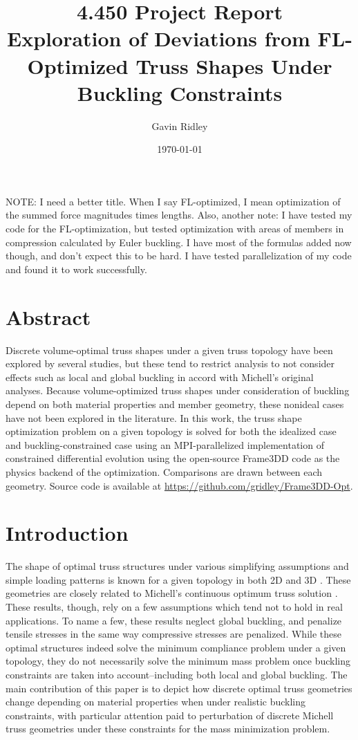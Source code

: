 \documentclass{article}
\author{Gavin Ridley}
\date{\today}
\title{4.450 Project Report\\ Exploration of Deviations from FL-Optimized Truss Shapes Under Buckling Constraints}
\begin{document}
\maketitle

NOTE: I need a better title. When I say FL-optimized, I mean optimization of the summed force magnitudes times lengths.
Also, another note: I have tested my code for the FL-optimization, but tested optimization with areas of members in compression
calculated by Euler buckling. I have most of the formulas added now though, and don't expect this to be hard. I have tested parallelization
of my code and found it to work successfully.

\section{Abstract}
Discrete volume-optimal truss shapes under a given truss topology have been explored by
several studies, but these tend to restrict analysis to not consider effects such
as local and global buckling in accord with Michell's original analyses.
Because volume-optimized truss shapes under consideration of
buckling depend on both material properties and member geometry, these nonideal cases have
not been explored in the literature. In this work, the truss shape optimization
problem on a given topology is solved for both the idealized case and buckling-constrained case
using an MPI-parallelized implementation of constrained differential evolution using
the open-source Frame3DD code as the physics backend of the optimization. Comparisons
are drawn between each geometry. Source code is available at \url{https://github.com/gridley/Frame3DD-Opt}.

\section{Introduction}

The shape of optimal truss structures under various simplifying assumptions and simple loading patterns
is known for a given topology in both 2D \cite{pragerNoteDiscretizedMichell1974,mazurekGeometricalAspectsOptimum2011} and 3D \cite{jacotStrainTensorMethod2016}.
These geometries are closely related to Michell's continuous optimum truss solution \cite{michellLimitsEconomyMaterial1904}.
These results, though, rely on a few assumptions
which tend not to hold in real applications. To name a few, these results neglect global
buckling, and penalize tensile stresses in the same way compressive stresses are penalized.
While these optimal structures indeed solve the minimum compliance problem under a given
topology, they do not necessarily solve the minimum mass problem once buckling constraints
are taken into account--including both local and global buckling. The main contribution
of this paper is to depict how discrete optimal truss geometries change depending on material properties
when under realistic buckling constraints, with particular attention paid to perturbation
of discrete Michell truss geometries under these constraints for the mass minimization problem.
\end{document}
